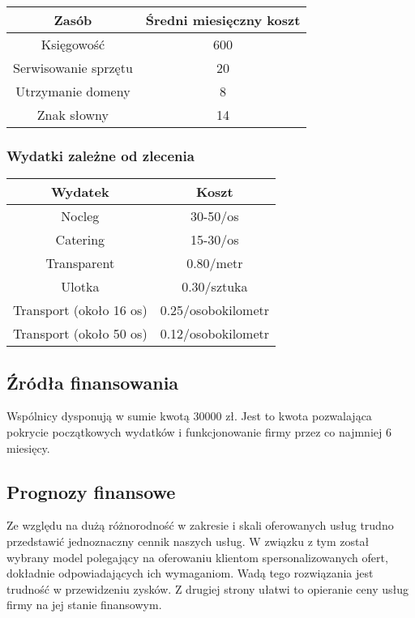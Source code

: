\documentclass{article}
\begin{document}
\begin{table}[!ht]
\label{table2}
\vspace{0.3cm}
\hspace{-2cm}
\centering
\begin{tabular}{|c|c|}
\hline
Zasób & Średni miesięczny koszt \\
\hline
Księgowość & 600 \\
Serwisowanie sprzętu & 20 \\
Utrzymanie domeny & 8 \\
Znak słowny & 14 \\
\hline
\end{tabular}
\end{table}

\subsubsection{Wydatki zależne od zlecenia}
\begin{table}[!ht]
\label{table2}
\vspace{0.3cm}
\hspace{-2cm}
\centering
\begin{tabular}{|c|c|}
\hline
Wydatek & Koszt \\
\hline
Nocleg & 30-50/os \\
Catering & 15-30/os \\
Transparent & 0.80/metr \\
Ulotka & 0.30/sztuka \\
Transport (około 16 os) & 0.25/osobokilometr \\
Transport (około 50 os) & 0.12/osobokilometr \\
\hline
\end{tabular}
\end{table}

\subsection{Źródła finansowania}
Wspólnicy dysponują w sumie kwotą 30000 zł. Jest to kwota pozwalająca pokrycie początkowych wydatków i funkcjonowanie firmy przez co najmniej 6 miesięcy.

\subsection{Prognozy finansowe}
Ze względu na dużą różnorodność w zakresie i skali oferowanych usług trudno przedstawić jednoznaczny cennik naszych usług. W związku z tym został wybrany model polegający na oferowaniu klientom spersonalizowanych ofert, dokładnie odpowiadających ich wymaganiom. Wadą tego rozwiązania jest trudność w przewidzeniu zysków. Z drugiej strony ułatwi to opieranie ceny usług firmy na jej stanie finansowym.
\end{document}
